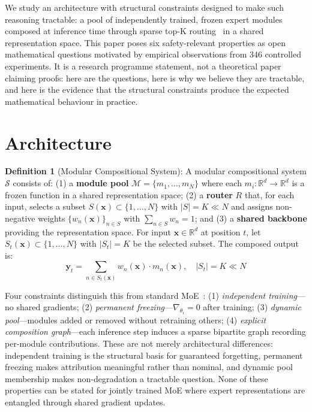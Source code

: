 \documentclass[conference]{IEEEtran}
\begin{document}
We study an architecture with structural constraints designed to make such reasoning tractable: a pool of independently trained, frozen expert modules composed at inference time through sparse top-K routing~\cite{shazeer2017outrageously} in a shared representation space. This paper poses six safety-relevant properties as open mathematical questions motivated by empirical observations from 346 controlled experiments. It is a research programme statement, not a theoretical paper claiming proofs: here are the questions, here is why we believe they are tractable, and here is the evidence that the structural constraints produce the expected mathematical behaviour in practice.

\section{Architecture}

\textbf{Definition 1} (Modular Compositional System): A modular compositional system $\mathcal{S}$ consists of: (1) a \textbf{module pool} $\mathcal{M} = \{m_1, \ldots, m_N\}$ where each $m_i : \mathbb{R}^d \to \mathbb{R}^d$ is a frozen function in a shared representation space; (2) a \textbf{router} $R$ that, for each input, selects a subset $S(\mathbf{x}) \subset \{1,\ldots,N\}$ with $|S| = K \ll N$ and assigns non-negative weights $\{w_n(\mathbf{x})\}_{n \in S}$ with $\sum_{n \in S} w_n = 1$; and (3) a \textbf{shared backbone} providing the representation space. For input $\mathbf{x} \in \mathbb{R}^d$ at position $t$, let $S_t(\mathbf{x}) \subset \{1,\ldots,N\}$ with $|S_t| = K$ be the selected subset. The composed output is:
\begin{equation}
\label{eq:composition}
\mathbf{y}_t = \sum_{n \in S_t(\mathbf{x})} w_n(\mathbf{x}) \cdot m_n(\mathbf{x}), \quad |S_t| = K \ll N
\end{equation}

Four constraints distinguish this from standard MoE~\cite{fedus2022switch,pfeiffer2023modular,shazeer2017outrageously}: (1) \emph{independent training}---no shared gradients; (2) \emph{permanent freezing}---$\nabla_{\theta_i} = 0$ after training; (3) \emph{dynamic pool}---modules added or removed without retraining others; (4) \emph{explicit composition graph}---each inference step induces a sparse bipartite graph recording per-module contributions. These are not merely architectural differences: independent training is the structural basis for guaranteed forgetting, permanent freezing makes attribution meaningful rather than nominal, and dynamic pool membership makes non-degradation a tractable question. None of these properties can be stated for jointly trained MoE where expert representations are entangled through shared gradient updates.
\end{document}
